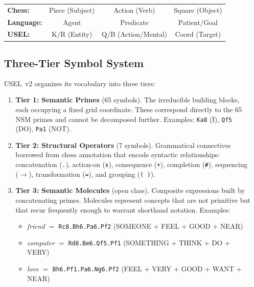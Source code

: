\documentclass[11pt,a4paper]{article}
\begin{document}
\begin{center}
\begin{tabular}{lccc}
\textbf{Chess:} & Piece (Subject) & Action (Verb) & Square (Object) \\
\textbf{Language:} & Agent & Predicate & Patient/Goal \\
\textbf{USEL:} & K/R (Entity) & Q/B (Action/Mental) & Coord (Target) \\
\end{tabular}
\end{center}

\subsection{Three-Tier Symbol System}
\label{sec:three-tier}

USEL~v2 organizes its vocabulary into three tiers:

\begin{enumerate}[nosep]
    \item \textbf{Tier 1: Semantic Primes} (65 symbols). The irreducible building blocks, each occupying a fixed grid coordinate. These correspond directly to the 65 NSM primes and cannot be decomposed further. Examples: \texttt{Ka8} (I), \texttt{Qf5} (DO), \texttt{Pa1} (NOT).

    \item \textbf{Tier 2: Structural Operators} (7 symbols). Grammatical connectives borrowed from chess annotation that encode syntactic relationships: concatenation (\texttt{.}), action-on (\texttt{x}), consequence (\texttt{+}), completion (\texttt{\#}), sequencing (\texttt{$\rightarrow$}), transformation (\texttt{=}), and grouping (\texttt{( )}).

    \item \textbf{Tier 3: Semantic Molecules} (open class). Composite expressions built by concatenating primes. Molecules represent concepts that are not primitive but that recur frequently enough to warrant shorthand notation. Examples:
    \begin{itemize}[nosep]
        \item \emph{friend} $=$ \texttt{Rc8.Bh6.Pa6.Pf2} (SOMEONE + FEEL + GOOD + NEAR)
        \item \emph{computer} $=$ \texttt{Rd8.Be6.Qf5.Pf1} (SOMETHING + THINK + DO + VERY)
        \item \emph{love} $=$ \texttt{Bh6.Pf1.Pa6.Ng6.Pf2} (FEEL + VERY + GOOD + WANT + NEAR)
    \end{itemize}
\end{enumerate}
\end{document}
